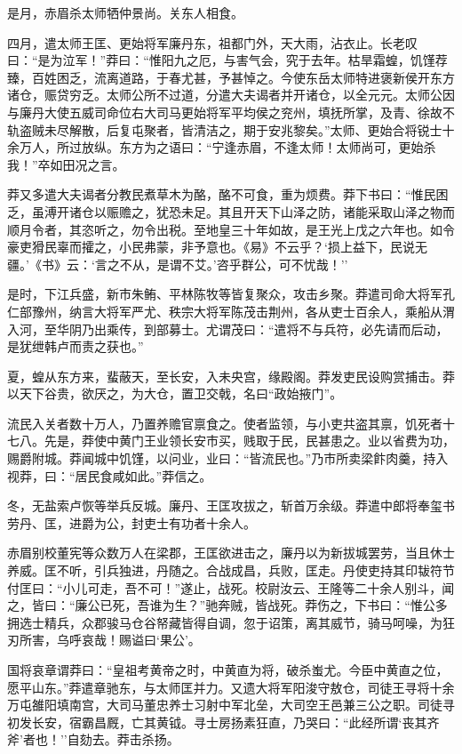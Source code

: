 \documentclass[]{article}
\begin{document}
是月，赤眉杀太师牺仲景尚。关东人相食。

四月，遣太师王匡、更始将军廉丹东，祖都门外，天大雨，沾衣止。长老叹曰：``是为泣军！''莽曰：``惟阳九之厄，与害气会，究于去年。枯旱霜蝗，饥馑荐臻，百姓困乏，流离道路，于春尤甚，予甚悼之。今使东岳太师特进褒新侯开东方诸仓，赈贷穷乏。太师公所不过道，分遣大夫谒者并开诸仓，以全元元。太师公因与廉丹大使五威司命位右大司马更始将军平均侯之兖州，填抚所掌，及青、徐故不轨盗贼未尽解散，后复屯聚者，皆清洁之，期于安兆黎矣。''太师、更始合将锐士十余万人，所过放纵。东方为之语曰：``宁逢赤眉，不逢太师！太师尚可，更始杀我！''卒如田况之言。

莽又多遣大夫谒者分教民煮草木为酪，酪不可食，重为烦费。莽下书曰：``惟民困乏，虽溥开诸仓以赈赡之，犹恐未足。其且开天下山泽之防，诸能采取山泽之物而顺月令者，其恣听之，勿令出税。至地皇三十年如故，是王光上戊之六年也。如令豪吏猾民辜而攉之，小民弗蒙，非予意也。《易》不云乎？`损上益下，民说无疆。'《书》云：`言之不从，是谓不艾。'咨乎群公，可不忧哉！''

是时，下江兵盛，新市朱鲔、平林陈牧等皆复聚众，攻击乡聚。莽遣司命大将军孔仁部豫州，纳言大将军严尤、秩宗大将军陈茂击荆州，各从吏士百余人，乘船从渭入河，至华阴乃出乘传，到部募士。尤谓茂曰：``遣将不与兵符，必先请而后动，是犹绁韩卢而责之获也。''

夏，蝗从东方来，蜚蔽天，至长安，入未央宫，缘殿阁。莽发吏民设购赏捕击。莽以天下谷贵，欲厌之，为大仓，置卫交戟，名曰``政始掖门''。

流民入关者数十万人，乃置养赡官禀食之。使者监领，与小吏共盗其禀，饥死者十七八。先是，莽使中黄门王业领长安市买，贱取于民，民甚患之。业以省费为功，赐爵附城。莽闻城中饥馑，以问业，业曰：``皆流民也。''乃市所卖梁飰肉羹，持入视莽，曰：``居民食咸如此。''莽信之。

冬，无盐索卢恢等举兵反城。廉丹、王匡攻拔之，斩首万余级。莽遣中郎将奉玺书劳丹、匡，进爵为公，封吏士有功者十余人。

赤眉别校董宪等众数万人在梁郡，王匡欲进击之，廉丹以为新拔城罢劳，当且休士养威。匡不听，引兵独进，丹随之。合战成昌，兵败，匡走。丹使吏持其印韨符节付匡曰：``小儿可走，吾不可！''遂止，战死。校尉汝云、王隆等二十余人别斗，闻之，皆曰：``廉公已死，吾谁为生？''驰奔贼，皆战死。莽伤之，下书曰：``惟公多拥选士精兵，众郡骏马仓谷帑藏皆得自调，忽于诏策，离其威节，骑马呵噪，为狂刃所害，乌呼哀哉！赐谥曰`果公'。

国将哀章谓莽曰：``皇祖考黄帝之时，中黄直为将，破杀蚩尤。今臣中黄直之位，愿平山东。''莽遣章驰东，与太师匡并力。又遗大将军阳浚守敖仓，司徒王寻将十余万屯雒阳填南宫，大司马董忠养士习射中军北垒，大司空王邑兼三公之职。司徒寻初发长安，宿霸昌厩，亡其黄钺。寻士房扬素狂直，乃哭曰：``此经所谓`丧其齐斧'者也！''自劾去。莽击杀扬。
\end{document}
